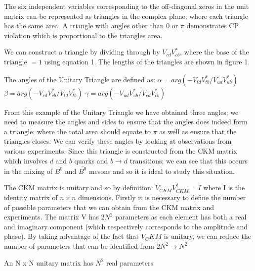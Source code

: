 \documentclass[12pt,a4paper]{article}
\begin{document}
The six independent variables corresponding to the off-diagonal zeros in the unit matrix can be represented as triangles in the complex plane; where each triangle has the same area. A triangle with angles other than 0 or $\pi$ demonstrates CP violation which is proportional to the triangles area. 

We can construct a triangle by dividing through by  %
$V_{cd} V_{cb}^*$, where the base of the triangle $= 1$ using equation 1. The lengths of the triangles are shown in figure 1.


The angles of the Unitary Triangle are defined as:
$ \alpha = arg(-V_{td}V_{tb}^*/V_{ud}V_{ub}^*)$
$ \beta = arg(-V_{cd}V_{cb}^*/V_{td}V_{tb}^*)$
$ \gamma = arg(-V_{ud}V_{ub}^*/V_{cd}V_{cb}^*)$

From this example of the Unitary Triangle we have obtained three angles; we need to measure the angles and sides to ensure that the angles does indeed form a triangle; where the total area should equate to $\pi$ as well as ensure that the triangles closes. We can verify these angles by looking at observations from various experiments. Since this triangle is constructed from the CKM matrix which involves $d$ and $b$ quarks and $b \rightarrow d$ transitions; we can see that this occurs in the mixing of $B^0$ and $\bar{B^0}$ mesons and so it is ideal to study this situation.

\newpage

The CKM matrix is unitary and so by definition: $ V_{CKM} V_{CKM}^\dagger = I $ where I is the identity matrix of $n \times n$ dimensions. Firstly it is necessary to define the number of possible parameters that we can obtain from the CKM matrix and experiments. The matrix V has $2N^2$ parameters as each element has both a real and imaginary component (which respectively corresponds to the amplitude and phase). By taking advantage of the fact that $V_CKM$ is unitary, we can reduce the number of parameters that can be identified from $2N^2 \rightarrow N^2$ 

An N x N unitary matrix has $N^2$ real parameters 
\end{document}
